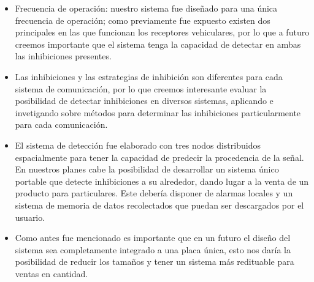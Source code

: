 \begin{itemize}
    \item Frecuencia de operación: nuestro sistema fue diseñado para una única frecuencia de operación; como previamente fue
    expuesto existen dos principales en las que funcionan los receptores vehiculares, por lo que a futuro creemos importante
    que el sistema tenga la capacidad de detectar en ambas las inhibiciones presentes.
    \item Las inhibiciones y las estrategias de inhibición son diferentes para cada sistema de comunicación, por lo que creemos 
    interesante evaluar la posibilidad de detectar inhibiciones en diversos sistemas, aplicando e invetigando
    sobre métodos para determinar las inhibiciones particularmente para cada comunicación.
    \item El sistema de detección fue elaborado con tres nodos distribuidos espacialmente para tener la capacidad de predecir la
    procedencia de la señal. En nuestros planes cabe la posibilidad de desarrollar un sistema único portable que
    detecte inhibiciones a su alrededor, dando lugar a la venta de un producto para particulares. Este debería disponer de
    alarmas locales y un sistema de memoria de datos recolectados que puedan ser descargados por el usuario.
    \item Como antes fue mencionado es importante que en un futuro el diseño del sistema sea completamente integrado a una
    placa única, esto nos daría la posibilidad de reducir los tamaños y tener un sistema más redituable para ventas en cantidad. 

\end{itemize}

